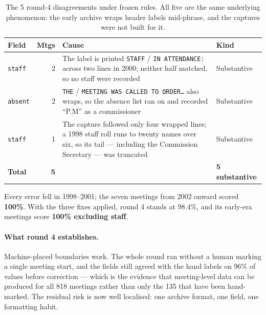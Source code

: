 \documentclass[11pt]{article}
\begin{document}
\begin{table}[h]
\centering
\begin{tabular}{p{}rp{}p{}}
\toprule
Field & Mtgs & Cause & Kind \\
\midrule
\texttt{staff} & 2 & The label is printed \texttt{STAFF} / \texttt{IN ATTENDANCE:} across two
lines in 2000; neither half matched, so no staff were recorded & Substantive \\
\texttt{absent} & 2 & \texttt{THE} / \texttt{MEETING WAS CALLED TO ORDER\ldots} also wraps, so
the absence list ran on and recorded ``P.M'' as a commissioner & Substantive \\
\texttt{staff} & 1 & The capture followed only four wrapped lines; a 1998 staff roll runs to
twenty names over six, so its tail --- including the Commission Secretary --- was truncated
& Substantive \\
\midrule
\textbf{Total} & \textbf{5} & & \textbf{5 substantive} \\
\bottomrule
\end{tabular}
\caption{The 5 round-4 disagreements under frozen rules. All five are the same underlying
phenomenon: the early archive wraps header labels mid-phrase, and the captures were not
built for it.}
\end{table}

\noindent
Every error fell in 1998--2001; the seven meetings from 2002 onward scored \textbf{100\%}.
With the three fixes applied, round 4 stands at 98.4\%, and its early-era meetings score
\textbf{100\% excluding staff}.

\paragraph{What round 4 establishes.} Machine-placed boundaries work. The whole round ran
without a human marking a single meeting start, and the fields still agreed with the hand
labels on 96\% of values before correction --- which is the evidence that meeting-level data
can be produced for all 818 meetings rather than only the 135 that have been hand-marked.
The residual risk is now well localised: one archive format, one field, one formatting
habit.
\end{document}
